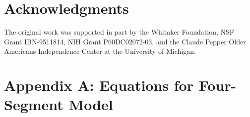 \documentclass[11pt]{article}
\begin{document}
\section*{Acknowledgments}

The original work was supported in part by the Whitaker Foundation, NSF Grant
IBN-9511814, NIH Grant P60DC02072-03, and the Claude Pepper Older Americans
Independence Center at the University of Michigan.




\clearpage
\section*{Appendix A: Equations for Four-Segment Model}
\setcounter{equation}{0}
\renewcommand{\theequation}{A\arabic{equation}}
\end{document}
